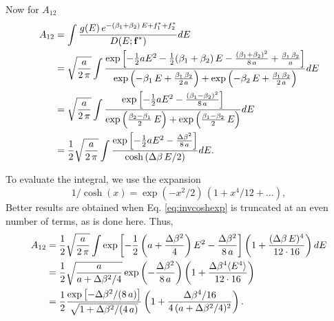 \documentclass[aip,jcp,preprint,notitlepage, superscriptaddress]{revtex4-1}
\begin{document}
Now for $A_{12}$
\begin{align}
A_{12}
&=
\int
\frac
{
  g(E) \, e^{ -(\beta_1 + \beta_2) \, E + f_1^* + f_2^*}
}
{
  D(E; \bm{\mathrm{f}}^*)
}
dE
\notag \\
&=
\sqrt{ \frac a { 2 \, \pi } }
\int
\frac
{
  \exp\left[
    -\frac 1 2 a E^2
    - \frac 1 2 (\beta_1 + \beta_2) \, E
    - \frac{
      (\beta_1 + \beta_2)^2
    }{ 8 \, a }
    +
    \frac{ \beta_1 \, \beta_2 } { a }
  \right]
}
{
  \exp\left(
    -\beta_1 \, E
    + \frac{\beta_1 \, \beta_2}{2 \, a}
  \right)
  +
  \exp\left(
    -\beta_2 \, E
    + \frac{\beta_1 \, \beta_2}{2 \, a}
  \right)
}
dE
\notag \\
&=
\sqrt{ \frac a { 2 \, \pi } }
\int
\frac
{
  \exp\left[
    -\frac 1 2 a E^2
    - \frac{
      (\beta_1 - \beta_2)^2
    }{ 8 \, a }
  \right]
}
{
  \exp\left(
    \frac{ \beta_2 - \beta_1 } {2 } \, E
  \right)
  +
  \exp\left(
    \frac{ \beta_1 - \beta_2 } {2 } \, E
  \right)
}
dE
\notag \\
&=
\frac 1 2
\sqrt{ \frac a { 2 \, \pi } }
\int
\frac
{
  \exp\left[
    -\frac 1 2 a E^2
    - \frac{
      \Delta \beta^2
    }{ 8 \, a }
  \right]
}
{
  \cosh\left(
    \Delta \beta \, E / 2
  \right)
}
dE.
\label{eq:A12}
\end{align}



To evaluate the integral,
we use the expansion
\begin{equation}
1/\cosh(x)
=
\exp(-x^2/2) \,
(1 + x^4/12 + \dots),
\label{eq:invcoshexp}
\end{equation}
%
Better results are obtained
when Eq. \eqref{eq:invcoshexp}
is truncated at an even number of terms,
as is done here.
%
Thus,
\begin{align}
A_{12}
&=
\frac 1 2
\sqrt{ \frac a { 2 \, \pi } }
\int
  \exp\left[
    -\frac 1 2
      \left(
          a + \frac{\Delta \beta^2}{4}
      \right) E^2
    - \frac{
      \Delta \beta^2
    }{ 8 \, a }
  \right]
  \left(
    1 + \frac{ (\Delta \beta \, E)^4 } { 12 \cdot 16 }
  \right)
dE
\notag \\
&=
\frac 1 2
\sqrt{
  \frac{ a  }
  { a +  \Delta \beta^2/4 }
}
\exp\left(
  - \frac{
    \Delta \beta^2
  }{ 8 \, a }
\right)
\left(
  1 + \frac{ \Delta \beta^4 \langle E^4 \rangle}
  { 12 \cdot 16 }
\right)
\notag \\
&=
\frac 1 2
\frac
{
  \exp\left[
    - \Delta \beta^2 / (8 \, a)
  \right]
}
{
  \sqrt{1 +  \Delta \beta^2/(4 \, a) }
}
\left(
  1 + \frac{ \Delta \beta^4 / 16 }
  { 4 \, (a + \Delta \beta^2 / 4)^2}
\right).
\end{align}
\end{document}
